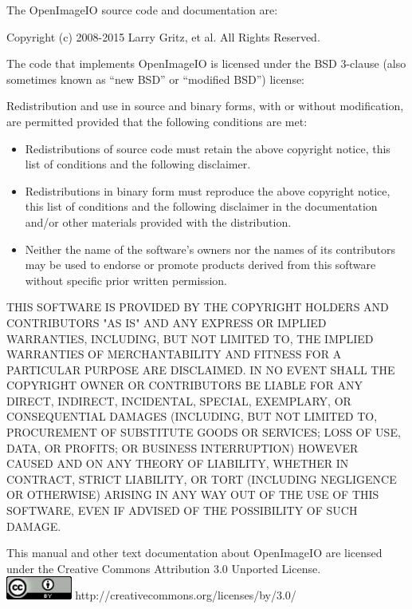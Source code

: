 \newpage
\label{speccopyr}

\vspace*{0.2in}

\noindent The OpenImageIO source code and
documentation are:

\vspace*{0.2in}

\noindent Copyright (c) 2008-2015 Larry Gritz, et al.
All Rights Reserved.

\vspace{0.5in}

The code that implements OpenImageIO is licensed under
the BSD 3-clause (also sometimes known as ``new BSD'' or
``modified BSD'') license:

\vspace{0.25in}

Redistribution and use in source and binary forms, with or without
modification, are permitted provided that the following conditions are
met:

\begin{itemize}
\item Redistributions of source code must retain the above copyright
  notice, this list of conditions and the following disclaimer.
\item Redistributions in binary form must reproduce the above copyright
  notice, this list of conditions and the following disclaimer in the
  documentation and/or other materials provided with the distribution.
\item Neither the name of the software's owners nor the names of its
  contributors may be used to endorse or promote products derived from
  this software without specific prior written permission.
\end{itemize}

THIS SOFTWARE IS PROVIDED BY THE COPYRIGHT HOLDERS AND CONTRIBUTORS
"AS IS" AND ANY EXPRESS OR IMPLIED WARRANTIES, INCLUDING, BUT NOT
LIMITED TO, THE IMPLIED WARRANTIES OF MERCHANTABILITY AND FITNESS FOR
A PARTICULAR PURPOSE ARE DISCLAIMED. IN NO EVENT SHALL THE COPYRIGHT
OWNER OR CONTRIBUTORS BE LIABLE FOR ANY DIRECT, INDIRECT, INCIDENTAL,
SPECIAL, EXEMPLARY, OR CONSEQUENTIAL DAMAGES (INCLUDING, BUT NOT
LIMITED TO, PROCUREMENT OF SUBSTITUTE GOODS OR SERVICES; LOSS OF USE,
DATA, OR PROFITS; OR BUSINESS INTERRUPTION) HOWEVER CAUSED AND ON ANY
THEORY OF LIABILITY, WHETHER IN CONTRACT, STRICT LIABILITY, OR TORT
(INCLUDING NEGLIGENCE OR OTHERWISE) ARISING IN ANY WAY OUT OF THE USE
OF THIS SOFTWARE, EVEN IF ADVISED OF THE POSSIBILITY OF SUCH DAMAGE.


\vspace{0.5in}

This manual and other text documentation about OpenImageIO
are licensed under the Creative Commons Attribution 3.0
Unported License. \\

\smallskip
\spc \includegraphics[width=0.85in]{figures/CC-30BY.png} 
\spc http://creativecommons.org/licenses/by/3.0/
 \bigskip 

